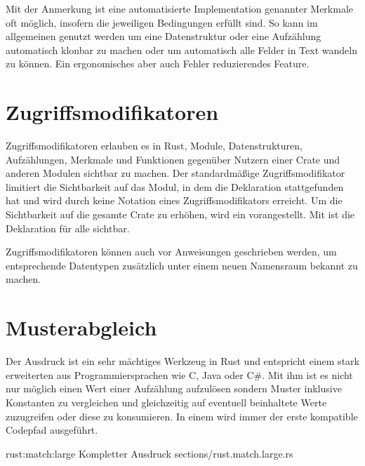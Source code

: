 Mit der Anmerkung \rustcinline{#[derive(..)]} ist eine automatisierte Implementation genannter Merkmale oft möglich, insofern die jeweiligen Bedingungen erfüllt sind.
So kann im allgemeinen  genutzt werden um eine Datenstruktur oder eine Aufzählung automatisch klonbar zu machen oder  um automatisch alle Felder in Text wandeln zu können.
Ein ergonomisches aber auch Fehler reduzierendes Feature.

\section{Zugriffsmodifikatoren}
\label{rust:access_modifier}

Zugriffsmodifikatoren erlauben es in Rust, Module, Datenstrukturen, Aufzählungen, Merkmale und Funktionen gegenüber Nutzern einer Crate und anderen Modulen sichtbar zu machen.
Der standardmäßige Zugriffsmodifikator limitiert die Sichtbarkeit auf das Modul, in dem die Deklaration stattgefunden hat und wird durch keine Notation eines Zugriffsmodifikators erreicht.
Um die Sichtbarkeit auf die gesamte Crate zu erhöhen, wird ein  vorangestellt.
Mit  ist die Deklaration für alle sichtbar.

Zugriffsmodifikatoren können auch vor  Anweisungen geschrieben werden, um entsprechende Datentypen zusätzlich unter einem neuen Namensraum bekannt zu machen.


\section{Musterabgleich}
\label{rust:match}

Der  Ausdruck ist ein sehr mächtiges Werkzeug in Rust und entspricht einem stark erweiterten  aus Programmiersprachen wie C, Java oder C\#.
Mit ihm ist es nicht nur möglich einen Wert einer Aufzählung aufzulösen sondern Muster inklusive Konstanten zu vergleichen und gleichzeitig auf eventuell beinhaltete Werte zuzugreifen oder diese zu konsumieren.
In einem  wird immer der erste kompatible Codepfad ausgeführt.

\rustcinclude
	{rust:match:large}
	{Kompletter  Ausdruck}
	{sections/rust.match.large.rs}

